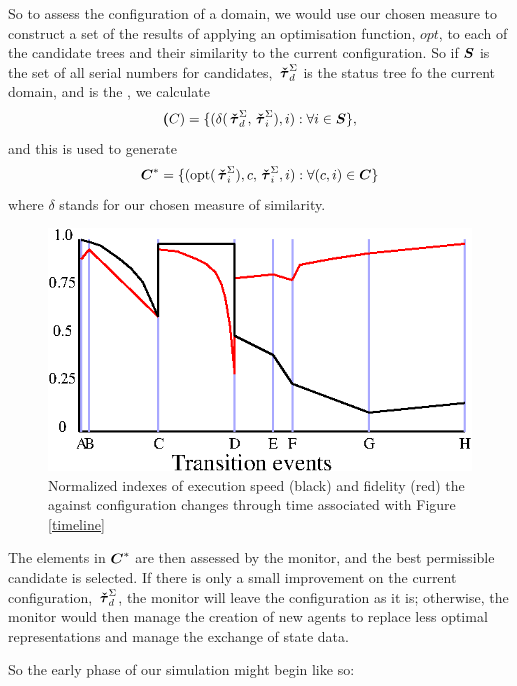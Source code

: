 So to assess the con\-fig\-ur\-a\-tion of a domain, we would use our chosen
measure to construct a set of the results of applying an optimisation
function, $opt$, to each of the candidate trees and their similarity
to the current con\-fig\-ur\-a\-tion.  So if $\boldsymbol{S}$ is the set of all
serial numbers for candidates, $\,\boldsymbol{\check{\tau}}^\Sigma_{d}$ is the status tree fo the
current domain, and  is the  , we calculate
\begin{equation*}
  \boldsymbol{(}C) = \{(\delta(\,\boldsymbol{\check{\tau}}^\Sigma_{d},\,\boldsymbol{\check{\tau}}^\Sigma_{i}),i): \forall i \in \boldsymbol{S}\},
\end{equation*}
and this is used to generate
\begin{equation*}
  \boldsymbol{C}^* = \{(\operatorname{opt}(\,\boldsymbol{\check{\tau}}^\Sigma_{i}),c,\,\boldsymbol{\check{\tau}}^\Sigma_{i},i): \forall(c,i) \in \boldsymbol{C}\}
\end{equation*}
where $\delta$ stands for our chosen measure of similarity.

\begin{figure}
\begin{center}
  \includegraphics{Figure4}
  \caption{Normalized indexes of execution speed (black) and fidelity (red) the 
    against configuration changes through time associated with Figure \ref{timeline}}
  \label{indices}
\end{center}
\end{figure}

The elements in $\boldsymbol{C}^*$ are then assessed by the monitor, and the
best permissible candidate is selected. If there is only a small
improvement on the current con\-fig\-ur\-a\-tion, $\,\boldsymbol{\check{\tau}}^\Sigma_{d}$, the monitor will
leave the con\-fig\-ur\-a\-tion as it is; otherwise, the monitor would then manage
the creation of new agents to replace less optimal rep\-re\-sen\-ta\-tions and
manage the exchange of state data. 




So the early phase of our simulation might begin like so:

